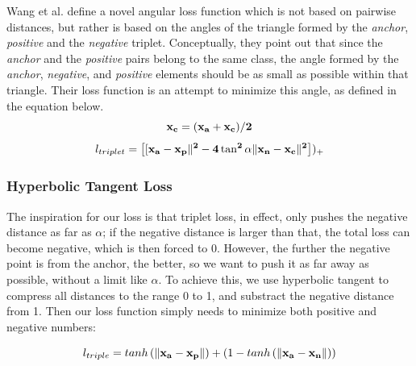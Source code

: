 Wang et al. \cite{DBLP:journals/corr/abs-1708-01682} define a novel angular loss function which is not based on pairwise distances, but rather is based on the angles of the triangle formed by the \textit{anchor}, \textit{positive} and the \textit{negative} triplet.  Conceptually, they point out that since the \textit{anchor} and the \textit{positive} pairs belong to the same class, the angle formed by the \textit{anchor}, \textit{negative}, and \textit{positive} elements should be as small as possible within that triangle.  Their loss function is an attempt to minimize this angle, as defined in the equation below.
\begin{equation}
\bf{x_{c}} = (\bf{x_{a}} + \bf{x_{c}}) / 2
\end{equation}
\begin{equation}
l_{triplet} = \left[[\bf{x_{a}} - \bf{x_{p}}\|^2 - 4 \tan^2 \alpha \|\bf{x_{n}} - \bf{x_{c}}\|^2 \right])_{+}
\end{equation}

\subsubsection{Hyperbolic Tangent Loss}

The inspiration for our loss is that triplet loss, in effect, only pushes the negative distance as far as $\alpha$; if the negative distance is larger than that, the total loss can become negative, which is then forced to 0.  However, the further the negative point is from the anchor, the better, so we want to push it as far away as possible, without a limit like $\alpha$.  To achieve this, we use hyperbolic tangent to compress all distances to the range 0 to 1, and substract the negative distance from 1.  Then our loss function simply needs to minimize both positive and negative numbers:

 \begin{equation}
  l_{triple} =  tanh\left(\|\bf{x_a} - \bf{x_p}\|\right) + \left(1-tanh\left(\|\bf{x_a} -\bf{x_n}\|\right)\right)
\label{tanh}
\end{equation}


